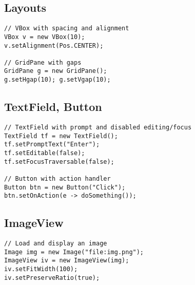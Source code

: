 \documentclass[10pt]{article}
\begin{document}
\begin{multicols}{2}
\subsection*{Layouts}
\begin{lstlisting}
// VBox with spacing and alignment
VBox v = new VBox(10);
v.setAlignment(Pos.CENTER);

// GridPane with gaps
GridPane g = new GridPane();
g.setHgap(10); g.setVgap(10);
\end{lstlisting}

\subsection*{TextField, Button}
\begin{lstlisting}
// TextField with prompt and disabled editing/focus
TextField tf = new TextField();
tf.setPromptText("Enter");
tf.setEditable(false);
tf.setFocusTraversable(false);

// Button with action handler
Button btn = new Button("Click");
btn.setOnAction(e -> doSomething());
\end{lstlisting}

\subsection*{ImageView}
\begin{lstlisting}
// Load and display an image
Image img = new Image("file:img.png");
ImageView iv = new ImageView(img);
iv.setFitWidth(100);
iv.setPreserveRatio(true);
\end{lstlisting}


\end{multicols}
\end{document}

